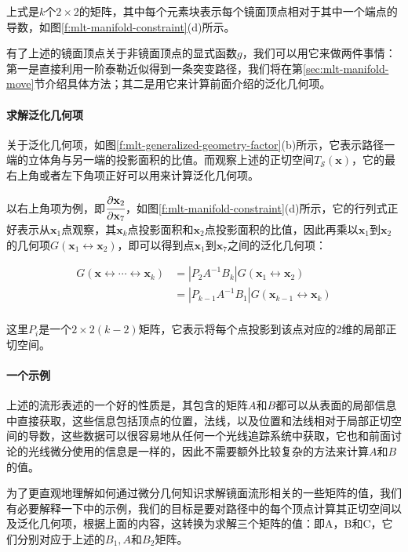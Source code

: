 \noindent 上式是$k$个$2\times 2$的矩阵，其中每个元素块表示每个镜面顶点相对于其中一个端点的导数，如图\ref{f:mlt-manifold-constraint}(d)所示。

有了上述的镜面顶点关于非镜面顶点的显式函数$g$，我们可以用它来做两件事情：第一是直接利用一阶泰勒近似得到一条突变路径，我们将在第\ref{sec:mlt-manifold-move}节介绍具体方法；其二是用它来计算前面介绍的泛化几何项。




\paragraph{求解泛化几何项}
关于泛化几何项，如图\ref{f:mlt-generalized-geometry-factor}(b)所示，它表示路径一端的立体角与另一端的投影面积的比值。而观察上述的正切空间$T_{\mathcal{S}}({\mathbf{x}})$，它的最右上角或者左下角项正好可以用来计算泛化几何项。

以右上角项为例，即$\cfrac{{\rm \partial} \mathbf{x}_2}{{\rm \partial} \mathbf{x}_7}$，如图\ref{f:mlt-manifold-constraint}(d)所示，它的行列式正好表示从$\mathbf{x}_1$点观察，其$\mathbf{x}_k$点投影面积和$\mathbf{x}_2$点投影面积的比值，因此再乘以$\mathbf{x}_1$到$\mathbf{x}_2$的几何项$G(\mathbf{x}_1\leftrightarrow\mathbf{x}_2)$，即可以得到点$\mathbf{x}_1$到$\mathbf{x}_7$之间的泛化几何项：

\begin{equation}
\begin{aligned}	
	G(\mathbf{x}\leftrightarrow\cdots\leftrightarrow\mathbf{x}_k)&=|P_2A^{-1}B_k|G(\mathbf{x}_1\leftrightarrow\mathbf{x}_2)\\
	&=|P_{k-1}A^{-1}B_1|G(\mathbf{x}_{k-1}\leftrightarrow\mathbf{x}_k)\\
\end{aligned}
\end{equation}

\noindent 这里$P_i$是一个$2\times 2(k-2)$矩阵，它表示将每个点投影到该点对应的2维的局部正切空间。




\paragraph{一个示例}
上述的流形表述的一个好的性质是，其包含的矩阵$A$和$B$都可以从表面的局部信息中直接获取，这些信息包括顶点的位置，法线，以及位置和法线相对于局部正切空间的导数，这些数据可以很容易地从任何一个光线追踪系统中获取，它也和前面讨论的光线微分使用的信息是一样的，因此不需要额外比较复杂的方法来计算$A$和$B$的值。

为了更直观地理解如何通过微分几何知识求解镜面流形相关的一些矩阵的值，我们有必要解释一下\cite{a:LIGHTTRANSPORTONPATHSPACEMANIFOLDS,a:ManifoldExplorationExpanded}中的示例，我们的目标是要对路径中的每个顶点计算其正切空间以及泛化几何项，根据上面的内容，这转换为求解三个矩阵的值：即A，B和C，它们分别对应于上述的$B_1,A$和$B_2$矩阵。

